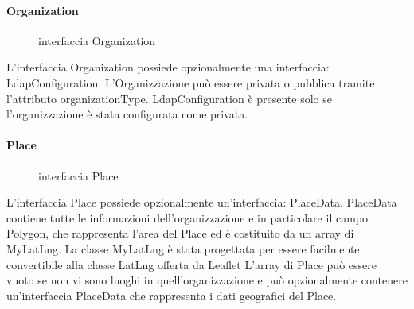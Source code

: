 \documentclass[../../manuale-manutentore.tex]{subfiles}
\begin{document}
\paragraph{Organization}%
\label{par:webapp/organization}
\begin{figure}[H]
  \centering
  \caption{interfaccia Organization}%
  \label{fig:web-app-organization}
\end{figure}
L'interfaccia Organization possiede opzionalmente una interfaccia: LdapConfiguration.
L'Organizzazione può essere privata o pubblica tramite l'attributo organizationType.
LdapConfiguration è presente solo se l'organizzazione è stata configurata come privata.

\paragraph{Place}%
\label{par:webapp/place}
\begin{figure}[H]
  \centering
  \caption{interfaccia Place}%
  \label{fig:web-app-place}
\end{figure}
L'interfaccia Place possiede opzionalmente un'interfaccia: PlaceData.
PlaceData contiene tutte le informazioni dell'organizzazione e in particolare il campo Polygon, che rappresenta l'area del Place ed è costituito da un array di MyLatLng.
La classe MyLatLng è stata progettata per essere facilmente convertibile alla classe LatLng offerta da Leaflet
L'array di Place può essere vuoto se non vi sono luoghi in quell'organizzazione e può opzionalmente contenere un'interfaccia PlaceData che rappresenta i dati geografici del Place.
\end{document}
